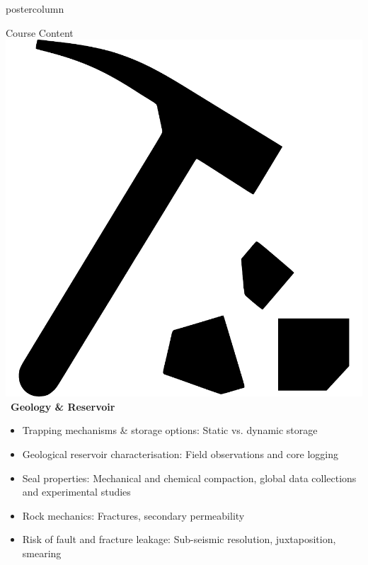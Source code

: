 \documentclass{beamer}
\begin{document}
\begin{frame}
\begin{columns}
\begin{column}{.382\textwidth}
\begin{beamercolorbox}[center]{postercolumn}
\begin{minipage}{.98\textwidth}
{\begin{myblock}{Course Content}
	\includegraphics[scale=0.1]{figures/icons/geo}~\textbf{Geology \& Reservoir}
	\begin{itemize}
		\item Trapping mechanisms \& storage options: Static vs. dynamic storage
		\item Geological reservoir characterisation: Field observations and core logging
		\item Seal properties: Mechanical and chemical compaction, global data collections and experimental studies
		\item Rock mechanics: Fractures, secondary permeability
		\item Risk of fault and fracture leakage: Sub-seismic resolution, juxtaposition, smearing
	\end{itemize}
	\vspace{0.5em}
	

\end{myblock}}
\end{minipage}
\end{beamercolorbox}
\end{column}
\end{columns}
\end{frame}
\end{document}
